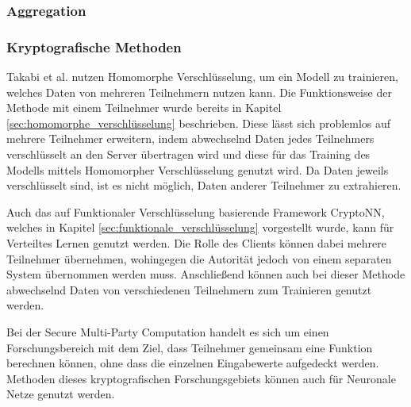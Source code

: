 \subsubsection*{Aggregation}
\cite{P-36}

\subsubsection*{Kryptografische Methoden}

Takabi et al. \cite{P-104} nutzen Homomorphe Verschlüsselung, um ein Modell zu trainieren, welches Daten von mehreren Teilnehmern nutzen kann. 
Die Funktionsweise der Methode mit einem Teilnehmer wurde bereits in Kapitel \ref{sec:homomorphe_verschlüsselung} beschrieben.
Diese lässt sich problemlos auf mehrere Teilnehmer erweitern, indem abwechselnd Daten jedes Teilnehmers verschlüsselt an den Server übertragen wird und diese für das Training des Modells mittels Homomorpher Verschlüsselung genutzt wird.
Da Daten jeweils verschlüsselt sind, ist es nicht möglich, Daten anderer Teilnehmer zu extrahieren.

Auch das auf Funktionaler Verschlüsselung basierende Framework CryptoNN\cite{P-53}, welches in Kapitel \ref{sec:funktionale_verschlüsselung} vorgestellt wurde, kann für Verteiltes Lernen genutzt werden. 
Die Rolle des Clients können dabei mehrere Teilnehmer übernehmen, wohingegen die Autorität jedoch von einem separaten System übernommen werden muss. 
Anschließend können auch bei dieser Methode abwechselnd Daten von verschiedenen Teilnehmern zum Trainieren genutzt werden.

Bei der Secure Multi-Party Computation handelt es sich um einen Forschungsbereich mit dem Ziel, dass Teilnehmer gemeinsam eine Funktion berechnen können, ohne dass die einzelnen Eingabewerte aufgedeckt werden. 
Methoden dieses kryptografischen Forschungsgebiets können auch für Neuronale Netze genutzt werden.

